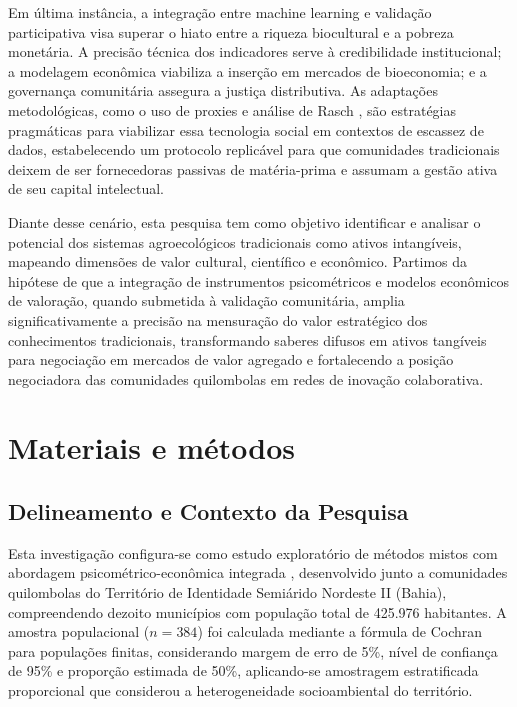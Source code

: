 Em última instância, a integração entre machine learning e validação participativa visa superar o hiato entre a riqueza biocultural e a pobreza monetária. A precisão técnica dos indicadores serve à credibilidade institucional; a modelagem econômica viabiliza a inserção em mercados de bioeconomia; e a governança comunitária assegura a justiça distributiva. As adaptações metodológicas, como o uso de proxies e análise de Rasch \cite{Rasch1960}, são estratégias pragmáticas para viabilizar essa tecnologia social em contextos de escassez de dados, estabelecendo um protocolo replicável para que comunidades tradicionais deixem de ser fornecedoras passivas de matéria-prima e assumam a gestão ativa de seu capital intelectual.

Diante desse cenário, esta pesquisa tem como objetivo identificar e analisar o potencial dos sistemas agroecológicos tradicionais como ativos intangíveis, mapeando dimensões de valor cultural, científico e econômico. Partimos da hipótese de que a integração de instrumentos psicométricos e modelos econômicos de valoração, quando submetida à validação comunitária, amplia significativamente a precisão na mensuração do valor estratégico dos conhecimentos tradicionais, transformando saberes difusos em ativos tangíveis para negociação em mercados de valor agregado e fortalecendo a posição negociadora das comunidades quilombolas em redes de inovação colaborativa.

\section{Materiais e métodos}

\subsection{Delineamento e Contexto da Pesquisa}

Esta investigação configura-se como estudo exploratório de métodos mistos \cite{Creswell2018} com abordagem psicométrico-econômica integrada \cite{Messick1995}, desenvolvido junto a comunidades quilombolas do Território de Identidade Semiárido Nordeste II (Bahia), compreendendo dezoito municípios com população total de 425.976 habitantes. A amostra populacional ($n = 384$) foi calculada mediante a fórmula de Cochran \cite{Cochran1977} para populações finitas, considerando margem de erro de 5\%, nível de confiança de 95\% e proporção estimada de 50\%, aplicando-se amostragem estratificada proporcional \cite{Krejcie1970} que considerou a heterogeneidade socioambiental do território. 

